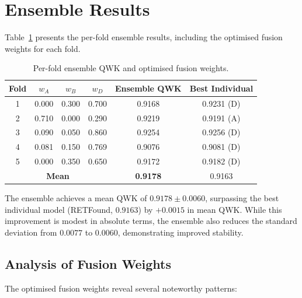 \section{Ensemble Results}
\label{sec:ensemble_results}

Table~\ref{tab:ensemble_detailed} presents the per-fold ensemble results, including the optimised fusion weights for each fold.

\begin{table}[htbp]
\centering
\caption{Per-fold ensemble QWK and optimised fusion weights.}
\label{tab:ensemble_detailed}
\begin{tabular}{cccccc}
\toprule
\textbf{Fold} & \textbf{$w_A$} & \textbf{$w_B$} & \textbf{$w_D$} & \textbf{Ensemble QWK} & \textbf{Best Individual} \\
\midrule
1 & 0.000 & 0.300 & 0.700 & 0.9168 & 0.9231 (D) \\
2 & 0.710 & 0.000 & 0.290 & 0.9219 & 0.9191 (A) \\
3 & 0.090 & 0.050 & 0.860 & 0.9254 & 0.9256 (D) \\
4 & 0.081 & 0.150 & 0.769 & 0.9076 & 0.9081 (D) \\
5 & 0.000 & 0.350 & 0.650 & 0.9172 & 0.9182 (D) \\
\midrule
\multicolumn{4}{c}{\textbf{Mean}} & \textbf{0.9178} & 0.9163 \\
\bottomrule
\end{tabular}
\end{table}

The ensemble achieves a mean QWK of $\mathbf{0.9178 \pm 0.0060}$, surpassing the best individual model (RETFound, $0.9163$) by $+0.0015$ in mean QWK. While this improvement is modest in absolute terms, the ensemble also reduces the standard deviation from $0.0077$ to $0.0060$, demonstrating improved stability.

\subsection{Analysis of Fusion Weights}

The optimised fusion weights reveal several noteworthy patterns:


